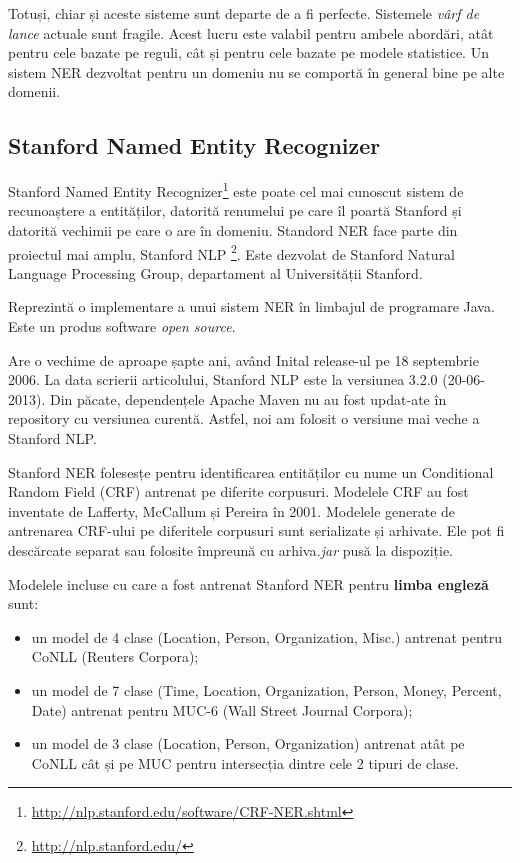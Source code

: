 Totuși, chiar și aceste sisteme sunt departe de a fi perfecte. Sistemele \textit{vârf de lance} actuale sunt fragile. Acest lucru este valabil pentru ambele abordări, atât pentru cele bazate pe reguli, cât și pentru cele bazate pe modele statistice. Un sistem NER dezvoltat pentru un domeniu nu se comportă în general bine pe alte domenii.

\subsection{Stanford Named Entity Recognizer}


Stanford Named Entity  Recognizer\footnote{\url{http://nlp.stanford.edu/software/CRF-NER.shtml}} este poate cel mai cunoscut sistem de recunoaștere a entităților, datorită renumelui pe care îl poartă Stanford și datorită vechimii pe care o are în domeniu. Standord NER face parte din proiectul mai amplu, Stanford NLP \footnote{\url{http://nlp.stanford.edu/}}. Este dezvolat de Stanford Natural Language Processing Group, departament al Universității Stanford. 

Reprezintă o implementare a unui sistem NER în limbajul de programare Java. Este un produs software \textit{open source}.

Are o vechime de aproape șapte ani, având Inital release-ul pe 18 septembrie 2006. La data scrierii articolului, Stanford NLP este la versiunea 3.2.0 (20-06-2013). Din păcate, dependențele Apache Maven nu au fost updat-ate în repository cu versiunea curentă. Astfel, noi am folosit o versiune mai veche a Stanford NLP.


Stanford NER folesesțe pentru identificarea entităților cu nume un Conditional Random Field (CRF) antrenat pe diferite corpusuri. Modelele CRF au fost inventate de Lafferty, McCallum și Pereira în 2001.\cite{Lafferty01conditionalrandom} Modelele generate de antrenarea CRF-ului pe diferitele corpusuri sunt serializate și arhivate. Ele pot fi descărcate separat sau folosite împreună cu arhiva\textit{.jar} pusă la dispoziție.


Modelele incluse cu care a fost antrenat Stanford NER pentru \textbf{limba engleză} sunt:

\begin{itemize}
\item un model de 4 clase (Location, Person, Organization, Misc.) antrenat pentru CoNLL (Reuters Corpora);
\item un model de 7 clase (Time, Location, Organization, Person, Money, Percent, Date) antrenat pentru MUC-6 (Wall Street Journal Corpora);
\item un model de 3 clase  (Location, Person, Organization) antrenat atât pe CoNLL cât și pe MUC pentru intersecția dintre cele 2 tipuri de clase.
\end{itemize}

